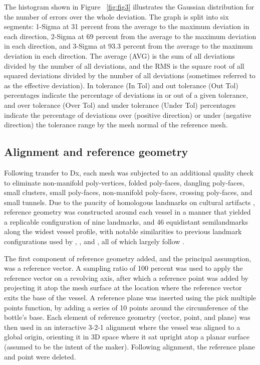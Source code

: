 \documentclass[article]{sa}
\begin{document}
The histogram shown in Figure ~\ref{fig:fig3} illustrates the Gaussian distribution for the number of errors over the whole deviation. The graph is split into six segments: 1-Sigma at 31 percent from the average to the maximum deviation in each direction, 2-Sigma at 69 percent from the average to the maximum deviation in each direction, and 3-Sigma at 93.3 percent from the average to the maximum deviation in each direction. The average (AVG) is the sum of all deviations divided by the number of all deviations, and the RMS is the square root of all squared deviations divided by the number of all deviations (sometimes referred to as the effective deviation). In tolerance (In Tol) and out tolerance (Out Tol) percentages indicate the percentage of deviations in or out of a given tolerance, and over tolerance (Over Tol) and under tolerance (Under Tol) percentages indicate the percentage of deviations over (positive direction) or under (negative direction) the tolerance range by the mesh normal of the reference mesh.

\subsection*{Alignment and reference geometry}

Following transfer to Dx, each mesh was subjected to an additional quality check to eliminate non-manifold poly-vertices, folded poly-faces, dangling poly-faces, small clusters, small poly-faces, non-manifold poly-faces, crossing poly-faces, and small tunnels. Due to the paucity of homologous landmarks on cultural artifacts \citep{RN1730}, reference geometry was constructed around each vessel in a manner that yielded a replicable configuration of nine landmarks, and 46 equidistant semilandmarks along the widest vessel profile, with notable similarities to previous landmark configurations used by \cite{RN1752}, \cite{RN1994}, and \cite{RN11631}, all of which largely follow \cite{RN11755}.

The first component of reference geometry added, and the principal assumption, was a reference vector. A sampling ratio of 100 percent was used to apply the reference vector on a revolving axis, after which a reference point was added by projecting it atop the mesh surface at the location where the reference vector exits the base of the vessel. A reference plane was inserted using the pick multiple points function, by adding a series of 10 points around the circumference of the bottle's base. Each element of reference geometry (vector, point, and plane) was then used in an interactive 3-2-1 alignment where the vessel was aligned to a global origin, orienting it in 3D space where it sat upright atop a planar surface (assumed to be the intent of the maker). Following alignment, the reference plane and point were deleted.
\end{document}
